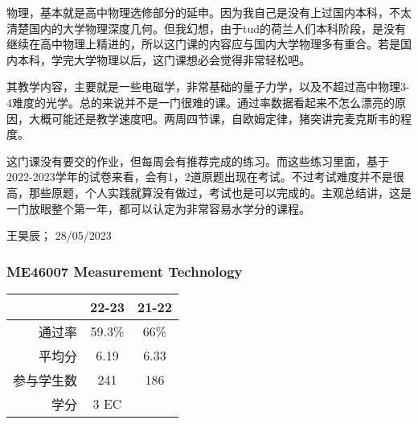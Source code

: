 物理，基本就是高中物理选修部分的延申。因为我自己是没有上过国内本科，不太清楚国内的大学物理深度几何。但我幻想，由于tud的荷兰人们本科阶段，是没有继续在高中物理上精进的，所以这门课的内容应与国内大学物理多有重合。若是国内本科，学完大学物理以后，这门课想必会觉得非常轻松吧。

其教学内容，主要就是一些电磁学，非常基础的量子力学，以及不超过高中物理3-4难度的光学。总的来说并不是一门很难的课。通过率数据看起来不怎么漂亮的原因，大概可能还是教学速度吧。两周四节课，自欧姆定律，猪突讲完麦克斯韦的程度。

这门课没有要交的作业，但每周会有推荐完成的练习。而这些练习里面，基于2022-2023学年的试卷来看，会有1，2道原题出现在考试。不过考试难度并不是很高，那些原题，个人实践就算没有做过，考试也是可以完成的。主观总结讲，这是一门放眼整个第一年，都可以认定为非常容易水学分的课程。
\begin{flushright}
王昊辰； 28/05/2023
\end{flushright}


\subsubsection{ME46007 Measurement Technology}
\begin{minipage}{0.45\textwidth}
\centering
{}
\end{minipage}%
\begin{minipage}{0.45\textwidth}
\raggedleft
\begin{tabular}{r|c|c}
\textbf{ } & \textbf{22-23} & \textbf{21-22} \\ \hline
通过率 & 59.3\% & 66\%\\ 
平均分 & 6.19 & 6.33\\ 
参与学生数 & 241 &186\\ 
学分 & 3 EC &\\
\end{tabular}
\end{minipage}\\

